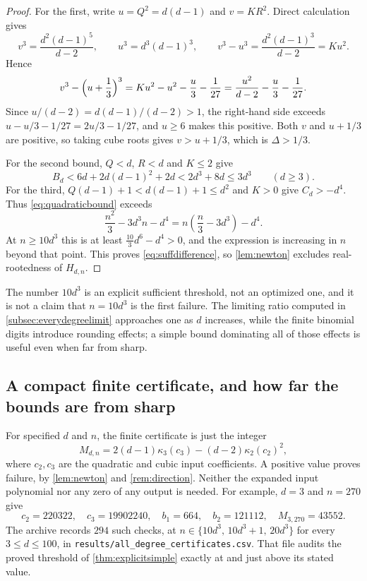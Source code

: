 \documentclass[11pt,letterpaper]{article}
\numberwithin{equation}{section}
\theoremstyle{definition}
\theoremstyle{remark}
\newcommand{\kap}{\kappa}
\begin{document}
\begin{proof}
For the first, write $u=Q^2=d(d-1)$ and $v=KR^2$. Direct calculation gives
\[
 v^3=\frac{d^2(d-1)^5}{d-2},\qquad u^3=d^3(d-1)^3,\qquad
 v^3-u^3=\frac{d^2(d-1)^3}{d-2}=Ku^2 .
\]
Hence
\[
 v^3-\Bigl(u+\frac13\Bigr)^3
 =Ku^2-u^2-\frac u3-\frac1{27}
 =\frac{u^2}{d-2}-\frac u3-\frac1{27}.
\]
Since $u/(d-2)=d(d-1)/(d-2)>1$, the right-hand side exceeds
$u-u/3-1/27=2u/3-1/27$, and $u\ge6$ makes this positive. Both $v$ and
$u+1/3$ are positive, so taking cube roots gives $v>u+1/3$, which is
$\Delta>1/3$.

For the second bound, $Q<d$, $R<d$ and $K\le2$ give
\[
 B_d<6d+2d(d-1)^2+2d<2d^3+8d\le3d^3\qquad(d\ge3).
\]
For the third, $Q(d-1)+1<d(d-1)+1\le d^2$ and $K>0$ give $C_d>-d^4$.
Thus \eqref{eq:quadraticbound} exceeds
\[
 \frac{n^2}{3}-3d^3n-d^4
 =n\left(\frac n3-3d^3\right)-d^4 .
\]
At $n\ge10d^3$ this is at least $\tfrac{10}3d^6-d^4>0$, and the expression is
increasing in $n$ beyond that point. This proves
\eqref{eq:suffdifference}, so \cref{lem:newton} excludes real-rootedness of
$H_{d,n}$.
\end{proof}

The number $10d^3$ is an explicit sufficient threshold, not an optimized one,
and it is not a claim that $n=10d^3$ is the first failure. The limiting ratio
computed in \cref{subsec:everydegreelimit} approaches one as $d$ increases,
while the finite binomial digits introduce rounding effects; a simple bound
dominating all of those effects is useful even when far from sharp.

\subsection{A compact finite certificate, and how far the bounds are from
sharp}\label{subsec:margin}

For specified $d$ and $n$, the finite certificate is just the integer
\begin{equation}\label{eq:margin}
 M_{d,n}=2(d-1)\kap_3(c_3)-(d-2)\kap_2(c_2)^2 ,
\end{equation}
where $c_2,c_3$ are the quadratic and cubic input coefficients. A positive
value proves failure, by \cref{lem:newton} and \cref{rem:direction}. Neither
the expanded input polynomial nor any zero of any output is needed. For
example, $d=3$ and $n=270$ give
\[
 c_2=220322,\quad c_3=19902240,\quad
 b_1=664,\quad b_2=121112,\quad M_{3,270}=43552 .
\]
The archive records $294$ such checks, at $n\in\{10d^3,\,10d^3+1,\,20d^3\}$
for every $3\le d\le100$, in
\texttt{results/all\_degree\_certificates.csv}. That file audits the proved
threshold of \cref{thm:explicitsimple} exactly at and just above its stated
value.
\end{document}
